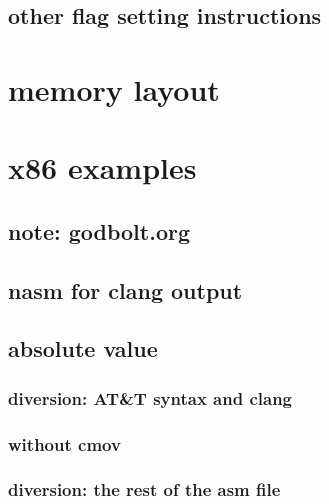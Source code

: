 \subsection{other flag setting instructions}



\section{memory layout}




\section{x86 examples}

\subsection{note: godbolt.org}



\subsection{nasm for clang output}



\subsection{absolute value}





\subsubsection{diversion: AT\&T syntax and clang}





\subsubsection{without cmov}



\subsubsection{diversion: the rest of the asm file}


